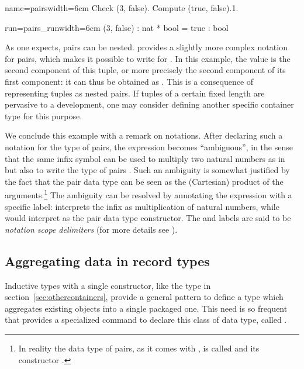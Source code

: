 \begin{coq-left}{name=pairs}{width=6cm}
Check (3, false).
Compute (true, false).1.
\end{coq-left}
\begin{coqout-right}{run=pairs_run}{width=6cm}
(3, false) : nat * bool
 = true : bool
\end{coqout-right}

As one expects, pairs can be nested. \Coq{} provides a slightly more complex
notation for pairs, which makes it possible to write  for
. In this example, the value  is the second
component of this tuple, or more precisely the second component of its
first component: it can thus be obtained as . This is a
consequence of representing tuples as nested pairs. If
tuples of a certain fixed length are pervasive to a development, one
may consider defining another specific container type for this
purpose. %

We conclude this example with a remark on notations. After declaring
such a notation for the type of pairs, the expression 
becomes ``ambiguous'',
in the sense that the same infix \C{*} symbol can be used to multiply two
natural numbers as in  but also to write the type of pairs .  Such an ambiguity is somewhat justified by the fact that the pair
data type can be seen as the (Cartesian) product of the arguments.\footnote{In reality the data type of pairs, as it comes with \Coq{}, is called  and its constructor .}  The
ambiguity can be resolved by annotating the expression with a specific
label:  interprets the infix \C{*} as multiplication of natural numbers,
while  would interpret \C{*} as the pair data type
constructor. The  and  labels are said to be
\emph{notation scope delimiters} (for more details see
\cite[``Interpretation scopes'']{Coq:manual}).

\subsection{Aggregating data in record types}
\label{sec:records}

Inductive types with a single constructor, like the type  in
section~\ref{sec:othercontainers}, %
provide a general pattern to define a type
which aggregates existing objects into a single packaged one. This
need is so frequent that \Coq{} provides a specialized command
to declare this class of data type, called .

